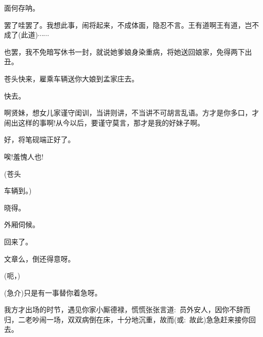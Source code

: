 {面何存{呐}。

{罢了哇罢了。我想此事，闹将起来，不成体面，隐忍不言。王有道啊王有道，岂不成了(此道)$\cdots{}\cdots{}$}

{也罢，我不免暗写休书一封，就说她爹娘身染重病，将她送回娘家，免得两下出丑。}

{苍头快来，雇乘车辆送你大娘到孟家庄去。}

{快去。}\hspace{40pt}~

{啊贤妹，想女儿家谨守闺训，当讲则讲，不当讲不可胡言乱语。方才是你多口，才闹出这样的事啊!从今以后，要谨守莫言，那才是我的好妹子啊。}

{好，将笔砚端正好了。}\hspace{10pt}~

{唉!羞愧人也!}\hspace{20pt}~



{(苍头\hspace{40pt}~

车辆到。)}

{晓得。}\hspace{40pt}~

{外厢伺候。}\hspace{30pt}~



{回来了。}\hspace{30pt}~

{文章么，倒还得意呀。}\hspace{10pt}~

{(呃，)\hspace{40pt}~

(急{\hwfs 介})只是有一事替你着急呀。}

{我方才出场的时节，遇见你家小厮德禄，慌慌张张言道:~员外安人，因你不辞而归，二老吵闹一场，双双病倒在床，十分地沉重，故而({\akai 或}:~故此)急急赶来接你回去。}

}

